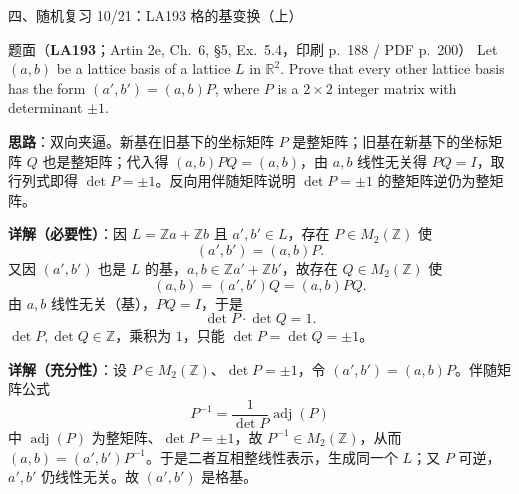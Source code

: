 \documentclass[aspectratio=169,10pt,fontset=none]{ctexbeamer}
\newcommand{\ex}[1]{\textcolor{accent}{\footnotesize\bfseries #1}}
\newcommand{\key}[1]{\textcolor{ink}{\bfseries #1}}
\begin{document}
\begin{frame}[t]{四、随机复习 10/21：LA193 格的基变换（上）}
\label{ex:LA193}
\scriptsize
\begin{block}{\footnotesize 题面（\ex{LA193}；Artin 2e, Ch.~6, §5, Ex.~5.4，印刷 p.~188 / PDF p.~200）}
Let $(a,b)$ be a lattice basis of a lattice $L$ in $\mathbb R^2$. Prove that every other lattice basis has the form $(a',b')=(a,b)P$, where $P$ is a $2\times2$ integer matrix with determinant $\pm1$.
\end{block}
\key{思路}：双向夹逼。新基在旧基下的坐标矩阵 $P$ 是整矩阵；旧基在新基下的坐标矩阵 $Q$ 也是整矩阵；代入得 $(a,b)PQ=(a,b)$，由 $a,b$ 线性无关得 $PQ=I$，取行列式即得 $\det P=\pm1$。反向用伴随矩阵说明 $\det P=\pm1$ 的整矩阵逆仍为整矩阵。

\key{详解（必要性）}：因 $L=\mathbb Za+\mathbb Zb$ 且 $a',b'\in L$，存在 $P\in M_2(\mathbb Z)$ 使
\[ (a',b')=(a,b)P . \]
又因 $(a',b')$ 也是 $L$ 的基，$a,b\in\mathbb Z a'+\mathbb Z b'$，故存在 $Q\in M_2(\mathbb Z)$ 使
\[ (a,b)=(a',b')Q=(a,b)PQ . \]
由 $a,b$ 线性无关（基），$PQ=I$，于是
\[ \det P\cdot\det Q=1 . \]
$\det P,\det Q\in\mathbb Z$，乘积为 $1$，只能 $\det P=\det Q=\pm1$。

\key{详解（充分性）}：设 $P\in M_2(\mathbb Z)$、$\det P=\pm1$，令 $(a',b')=(a,b)P$。伴随矩阵公式
\[ P^{-1}=\frac{1}{\det P}\operatorname{adj}(P) \]
中 $\operatorname{adj}(P)$ 为整矩阵、$\det P=\pm1$，故 $P^{-1}\in M_2(\mathbb Z)$，从而 $(a,b)=(a',b')P^{-1}$。于是二者互相整线性表示，生成同一个 $L$；又 $P$ 可逆，$a',b'$ 仍线性无关。故 $(a',b')$ 是格基。
\end{frame}
\end{document}
